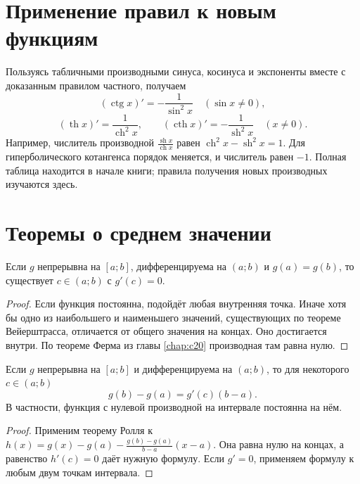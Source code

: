\section{Применение правил к новым функциям}
Пользуясь табличными производными синуса, косинуса и экспоненты вместе с доказанным правилом частного, получаем
\[
(\operatorname{ctg}x)'=-\frac1{\sin^2x}\quad(\sin x\ne0),
\]
\[
(\operatorname{th}x)'=\frac1{\operatorname{ch}^2x},\qquad
(\operatorname{cth}x)'=-\frac1{\operatorname{sh}^2x}\quad(x\ne0).
\]
Например, числитель производной \(\frac{\operatorname{sh}x}{\operatorname{ch}x}\) равен \(\operatorname{ch}^2x-\operatorname{sh}^2x=1\). Для гиперболического котангенса порядок меняется, и числитель равен \(-1\). Полная таблица находится в начале книги; правила получения новых производных изучаются здесь.

\section{Теоремы о среднем значении}
\begin{theorem}\label{thm:legacy-c29-5}
Если \(g\) непрерывна на \([a;b]\), дифференцируема на \((a;b)\) и \(g(a)=g(b)\), то существует \(c\in(a;b)\) с \(g'(c)=0\).
\end{theorem}
\begin{proof}
Если функция постоянна, подойдёт любая внутренняя точка. Иначе хотя бы одно из наибольшего и наименьшего значений, существующих по теореме Вейерштрасса, отличается от общего значения на концах. Оно достигается внутри. По теореме Ферма из главы \ref{chap:c20} производная там равна нулю.
\end{proof}
\begin{theorem}\label{thm:legacy-c29-6}
Если \(g\) непрерывна на \([a;b]\) и дифференцируема на \((a;b)\), то для некоторого \(c\in(a;b)\)
\[
g(b)-g(a)=g'(c)(b-a).
\]
В частности, функция с нулевой производной на интервале постоянна на нём.
\end{theorem}
\begin{proof}
Применим теорему Ролля к \(h(x)=g(x)-g(a)-\frac{g(b)-g(a)}{b-a}(x-a)\). Она равна нулю на концах, а равенство \(h'(c)=0\) даёт нужную формулу. Если \(g'=0\), применяем формулу к любым двум точкам интервала.
\end{proof}
